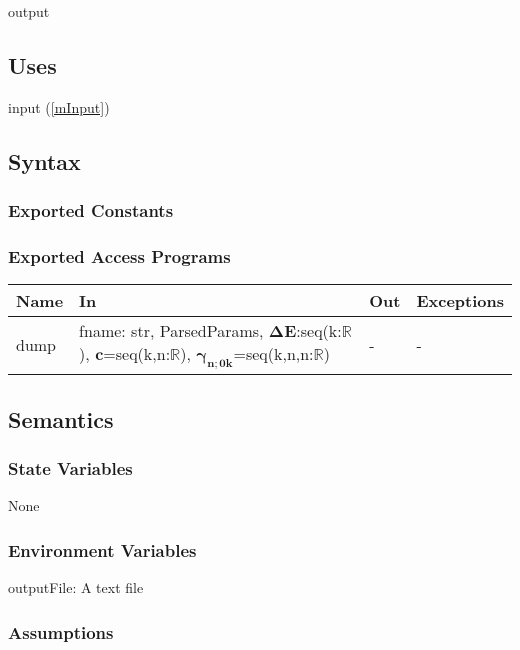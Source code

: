 \documentclass[12pt, titlepage]{article}
\begin{document}
output

\subsection{Uses}
input (\ref{mInput})

\subsection{Syntax}

\subsubsection{Exported Constants}

\subsubsection{Exported Access Programs}

\begin{center}
	\begin{tabular}{p{2cm} p{4cm} p{4cm} p{2cm}}
		\hline
		\textbf{Name} & \textbf{In} & \textbf{Out} & \textbf{Exceptions} \\
		\hline
		dump & fname: str, ParsedParams, $\boldsymbol{\Delta 
		E}$:seq(k:$\mathbb{R}$), 
		$\boldsymbol{c}$=seq(k,n:$\mathbb{R}$), 
		$\boldsymbol{\gamma_{n;0k}}$=seq(k,n,n:$\mathbb{R}$)& - & - \\
		\hline
	\end{tabular}
\end{center}

\subsection{Semantics}

\subsubsection{State Variables}
None

\subsubsection{Environment Variables}
outputFile: A text file

\subsubsection{Assumptions}
\end{document}
